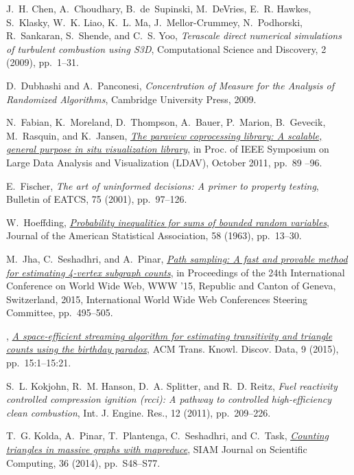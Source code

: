\documentclass[final]{siamltex}
\begin{document}
\begin{thebibliography}{10}
{\sc J.~H. Chen, A.~Choudhary, B.~de~Supinski, M.~DeVries, E.~R. Hawkes,
  S.~Klasky, W.~K. Liao, K.~L. Ma, J.~Mellor-Crummey, N.~Podhorski,
  R.~Sankaran, S.~Shende, and C.~S. Yoo}, {\em Terascale direct numerical
  simulations of turbulent combustion using {S}3{D}}, Computational Science and
  Discovery, 2 (2009), pp.~1--31.

{\sc D.~Dubhashi and A.~Panconesi}, {\em Concentration of Measure for the
  Analysis of Randomized Algorithms}, Cambridge University Press, 2009.

{\sc N.~Fabian, K.~Moreland, D.~Thompson, A.~Bauer, P.~Marion, B.~Gevecik,
  M.~Rasquin, and K.~Jansen},
  \href{http://dx.doi.org/10.1109/LDAV.2011.6092322}{{\em The paraview
  coprocessing library: A scalable, general purpose in situ visualization
  library}}, in Proc. of IEEE Symposium on Large Data Analysis and
  Visualization (LDAV), October 2011, pp.~89 --96.

{\sc E.~Fischer}, {\em The art of uninformed decisions: A primer to property
  testing}, Bulletin of EATCS, 75 (2001), pp.~97--126.

{\sc W.~Hoeffding}, \href{http://www.jstor.org/stable/2282952}{{\em Probability
  inequalities for sums of bounded random variables}}, Journal of the American
  Statistical Association, 58 (1963), pp.~13--30.

{\sc M.~Jha, C.~Seshadhri, and A.~Pinar},
  \href{http://dx.doi.org/10.1145/2736277.2741101}{{\em Path sampling: A fast
  and provable method for estimating 4-vertex subgraph counts}}, in Proceedings
  of the 24th International Conference on World Wide Web, WWW '15, Republic and
  Canton of Geneva, Switzerland, 2015, International World Wide Web Conferences
  Steering Committee, pp.~495--505.

\leavevmode\vrule height 2pt depth -1.6pt width 23pt,
  \href{http://dx.doi.org/10.1145/2700395}{{\em A space-efficient streaming
  algorithm for estimating transitivity and triangle counts using the birthday
  paradox}}, ACM Trans. Knowl. Discov. Data, 9 (2015), pp.~15:1--15:21.

{\sc S.~L. Kokjohn, R.~M. Hanson, D.~A. Splitter, and R.~D. Reitz}, {\em Fuel
  reactivity controlled compression ignition (rcci): A pathway to controlled
  high-efficiency clean combustion}, Int. J. Engine. Res., 12 (2011), pp.~209--226.

{\sc T.~G. Kolda, A.~Pinar, T.~Plantenga, C.~Seshadhri, and C.~Task},
  \href{http://dx.doi.org/10.1137/13090729X}{{\em Counting triangles in massive
  graphs with mapreduce}}, SIAM Journal on Scientific Computing, 36 (2014),
  pp.~S48--S77.


\end{thebibliography}
\end{document}
